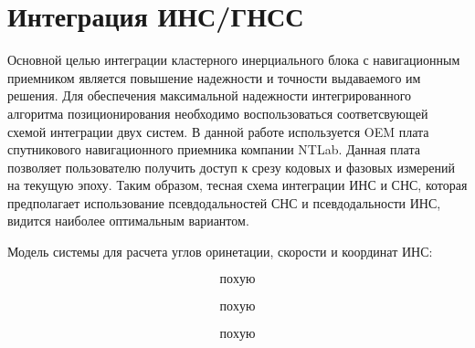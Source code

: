 \newpage
\section {Интеграция ИНС/ГНСС}

 
 Основной целью интеграции кластерного инерциального блока с навигационным приемником является повышение
 надежности и точности выдаваемого им решения. Для обеспечения максимальной надежности интегрированного алгоритма позиционирования необходимо воспользоваться соответсвующей схемой интеграции двух систем. 
 В данной работе используется OEM плата спутникового навигационного приемника компании NTLab. Данная плата позволяет пользователю получить доступ к срезу кодовых и фазовых измерений на текущую эпоху. Таким образом, тесная схема интеграции ИНС и СНС, которая предполагает использование псевдодальностей СНС и псевдодальности ИНС, видится наиболее оптимальным вариантом. 
 
 Модель системы для расчета углов оринетации, скорости и координат ИНС: 
 
 
 \begin{equation}
 	\label{eq:att_ins}
 	\begin{gathered}
	похую
 	\end{gathered}
 \end{equation}


\begin{equation}
	\label{eq:vel_ins}
	\begin{gathered}
	похую	
	\end{gathered}
\end{equation}

\begin{equation}
	\label{eq:coord_ins}
	\begin{gathered}
	похую	
	\end{gathered}
\end{equation}
 
 